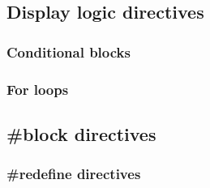 \subsection{Display logic directives}

\subsubsection{Conditional blocks}

\subsubsection{For loops}

\subsection{\#block directives}

\subsubsection{\#redefine directives}


